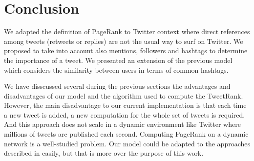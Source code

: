 \section{Conclusion}
We adapted the definition of PageRank to Twitter context where direct references among tweets (retweets or replies) are not the usual way to surf on Twitter. We proposed to take into account also mentions, followers and hashtags to determine the importance of a tweet. We presented an extension of the previous model which considers the similarity between users in terms of common hashtags. 

We have disscussed several during the previous sections the advantages and disadvantages of our model and the algorithm used to compute the TweetRank. However, the main disadvantage to our current implementation is that each time a new tweet is added, a new computation for the whole set of tweets is required. And this approach does not scale in a dynamic environment like Twitter where millions of tweets are published each second. Computing PageRank on a dynamic network is a well-studied problem. Our model could be adapted to the approaches described in \cite{Bahmani:2010:FIP:1929861.1929864,Desikan:2005:IPR:1062745.1062885} easily, but that is more over the purpose of this work.